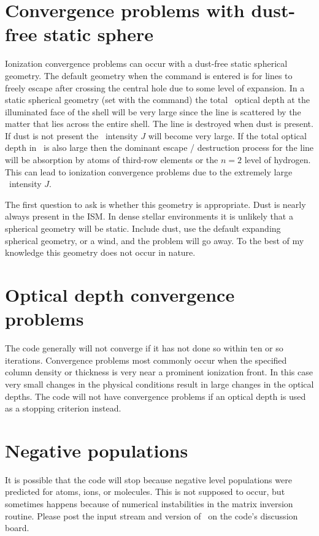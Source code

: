 \section{Convergence problems with dust-free static sphere}

Ionization convergence problems can occur with a dust-free static
spherical geometry.
The default geometry when the  command is entered
is for lines to freely escape after crossing the central hole due to some
level of expansion.
In a static spherical geometry (set with the
 command) the total \la\ optical depth
at the illuminated face of the
shell will be very large since the line is scattered by the matter that
lies across the entire shell.
The line is destroyed when dust is present.
If dust is not present the \la\ intensity $J$ will become very large.  If the
total optical depth in \la\ is also large then the dominant escape /
destruction process for the line will be absorption by atoms of third-row
elements or the $n=2$ level of hydrogen.  This can lead to ionization
convergence problems due to the extremely large \la\ intensity $J$.

The first question to ask is whether this geometry is appropriate.  Dust
is nearly always present in the ISM.  In dense stellar environments it is
unlikely that a spherical geometry will be static.  Include dust, use the
default expanding spherical geometry, or a wind, and the problem will go
away.  To the best of my knowledge this geometry does not occur in nature.

\section{Optical depth convergence problems}

The code generally will not converge if it has not done so within ten
or so iterations.  Convergence problems most commonly occur when the
specified column density or thickness is very near a prominent ionization
front.  In this case very small changes in the physical conditions result
in large changes in the optical depths.
The code will not have convergence
problems if an optical depth is used as a stopping criterion instead.

\section{Negative populations}

It is possible that the code will stop because negative level populations
were predicted for atoms, ions, or molecules.
This is not supposed to occur,
but sometimes happens because of numerical instabilities in the matrix
inversion routine.
Please post the input stream and version of \Cloudy\ on
the code's discussion board.

